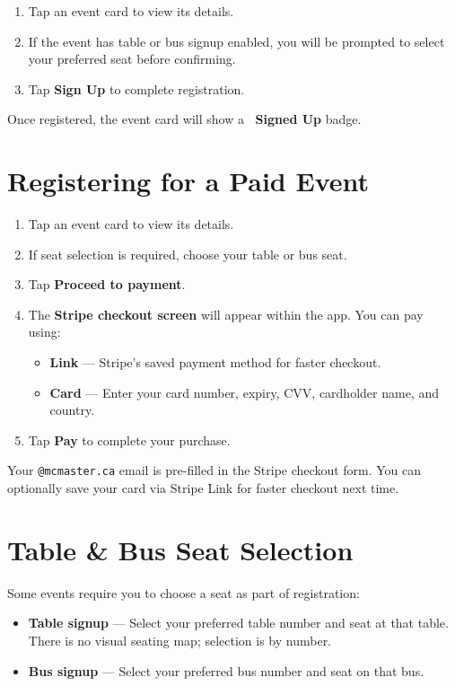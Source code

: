 \documentclass[12pt, twoside]{report}
\newcommand{\uielem}[1]{\textbf{#1}}
\begin{document}
\begin{enumerate}
  \item Tap an event card to view its details.
  \item If the event has table or bus signup enabled, you will be prompted
        to select your preferred seat before confirming.
  \item Tap \uielem{Sign Up} to complete registration.
\end{enumerate}

Once registered, the event card will show a \textbf{\checkmark\ Signed Up} badge.

\section{Registering for a Paid Event}

\begin{enumerate}
  \item Tap an event card to view its details.
  \item If seat selection is required, choose your table or bus seat.
  \item Tap \uielem{Proceed to payment}.
  \item The \textbf{Stripe checkout screen} will appear within the app.
        You can pay using:
    \begin{itemize}
      \item \textbf{Link} --- Stripe's saved payment method for faster checkout.
      \item \textbf{Card} --- Enter your card number, expiry, CVV,
            cardholder name, and country.
    \end{itemize}
  \item Tap \uielem{Pay} to complete your purchase.
\end{enumerate}

\begin{notebox}
Your \texttt{@mcmaster.ca} email is pre-filled in the Stripe checkout form.
You can optionally save your card via Stripe Link for faster checkout next time.
\end{notebox}

\section{Table \& Bus Seat Selection}

Some events require you to choose a seat as part of registration:

\begin{itemize}
  \item \textbf{Table signup} --- Select your preferred table number and seat
        at that table. There is no visual seating map; selection is by number.
  \item \textbf{Bus signup} --- Select your preferred bus number and seat on
        that bus.
\end{itemize}
\end{document}
